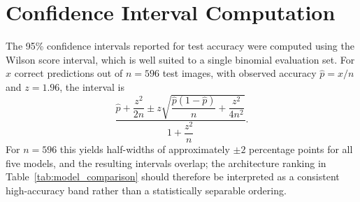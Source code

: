 \documentclass[ASNA, twocolumn]{USG}
\begin{document}


\appendix

\section{Confidence Interval Computation}
\label{app:ci}
The 95\% confidence intervals reported for test accuracy were computed using the Wilson score interval, which is well suited to a single binomial evaluation set. For $x$ correct predictions out of $n=596$ test images, with observed accuracy $\hat{p}=x/n$ and $z=1.96$, the interval is
\begin{equation}
\frac{\hat{p} + \dfrac{z^{2}}{2n} \pm z\sqrt{\dfrac{\hat{p}(1-\hat{p})}{n} + \dfrac{z^{2}}{4n^{2}}}}{1 + \dfrac{z^{2}}{n}}.
\end{equation}
For $n=596$ this yields half-widths of approximately $\pm2$ percentage points for all five models, and the resulting intervals overlap; the architecture ranking in Table~\ref{tab:model_comparison} should therefore be interpreted as a consistent high-accuracy band rather than a statistically separable ordering.
\end{document}
